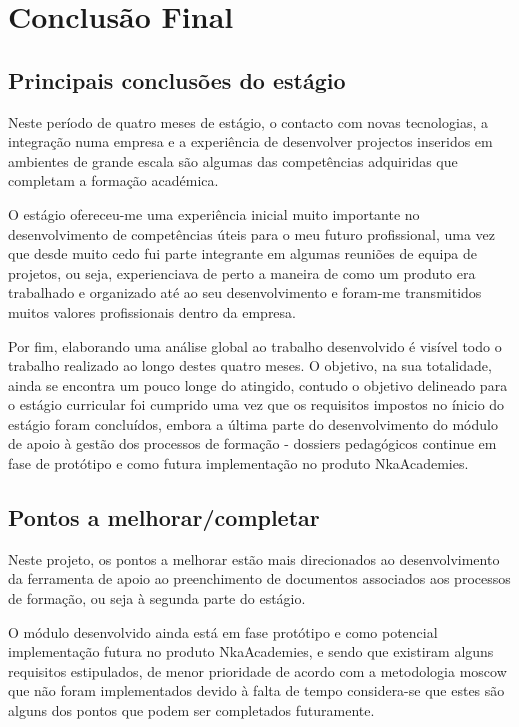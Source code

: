 \chapter{Conclusão Final}
\label{conc}
\section{Principais conclusões do estágio}

Neste período de quatro meses de estágio, o contacto com novas tecnologias, a integração numa empresa e a experiência de desenvolver projectos inseridos em ambientes de grande escala são algumas das competências adquiridas que completam a formação académica.

O estágio ofereceu-me uma experiência inicial muito importante no desenvolvimento de competências úteis para o meu futuro profissional, uma vez que desde muito cedo fui parte integrante em algumas reuniões de equipa de projetos, ou seja, experienciava de perto a maneira de como um produto era trabalhado e organizado até ao seu desenvolvimento e foram-me transmitidos muitos valores profissionais dentro da empresa.

Por fim, elaborando uma análise global ao trabalho desenvolvido é visível todo o trabalho realizado ao longo destes quatro meses. O objetivo, na sua totalidade, ainda se encontra um pouco longe do atingido, contudo o objetivo delineado para o estágio curricular foi cumprido uma vez que os requisitos impostos no ínicio do estágio foram concluídos, embora a última parte do desenvolvimento do módulo de apoio à gestão dos processos de formação - dossiers pedagógicos continue em fase de protótipo e como futura implementação no produto NkaAcademies.


\section{Pontos a melhorar/completar}

Neste projeto, os pontos a melhorar estão mais direcionados ao desenvolvimento da ferramenta de apoio ao preenchimento de documentos associados aos processos de formação, ou seja à segunda parte do estágio.

O módulo desenvolvido ainda está em fase protótipo e como potencial implementação futura no produto NkaAcademies, e sendo que existiram alguns requisitos estipulados, de menor prioridade de acordo com a metodologia \acrshort{moscow} que não foram implementados devido à falta de tempo considera-se que estes são alguns dos pontos que podem ser completados futuramente.
